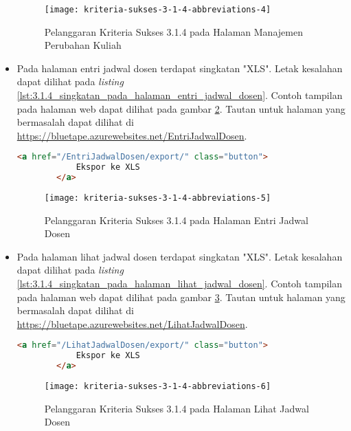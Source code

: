 \begin{itemize}
    \begin{figure}[H]
        \centering  
        \texttt{[image: kriteria-sukses-3-1-4-abbreviations-4]}  
        \caption[Pelanggaran Kriteria Sukses 3.1.4 pada Halaman Manajemen Perubahan Kuliah]{Pelanggaran Kriteria Sukses 3.1.4 pada Halaman Manajemen Perubahan Kuliah}
        \label{fig:3.1.4_abbreviations_4}  
    \end{figure}
    
    \item Pada halaman entri jadwal dosen terdapat singkatan "XLS". Letak kesalahan dapat dilihat pada \textit{listing} \ref{lst:3.1.4_singkatan_pada_halaman_entri_jadwal_dosen}. Contoh tampilan pada halaman web dapat dilihat pada gambar \ref{fig:3.1.4_abbreviations_5}. Tautan untuk halaman yang bermasalah dapat dilihat di \url{https://bluetape.azurewebsites.net/EntriJadwalDosen}.
    \begin{lstlisting}[frame=single, label={lst:3.1.4_singkatan_pada_halaman_entri_jadwal_dosen}, language=HTML, caption=Pelanggaran Kriteria Sukses 3.1.4 pada Halaman Entri Jadwal Dosen]
        <a href="/EntriJadwalDosen/export/" class="button">
            Ekspor ke XLS
        </a>
    \end{lstlisting}

    \begin{figure}[H]
        \centering  
        \texttt{[image: kriteria-sukses-3-1-4-abbreviations-5]}  
        \caption[Pelanggaran Kriteria Sukses 3.1.4 pada Halaman Entri Jadwal Dosen]{Pelanggaran Kriteria Sukses 3.1.4 pada Halaman Entri Jadwal Dosen}
        \label{fig:3.1.4_abbreviations_5}  
    \end{figure}
    
    \item Pada halaman lihat jadwal dosen terdapat singkatan "XLS". Letak kesalahan dapat dilihat pada \textit{listing} \ref{lst:3.1.4_singkatan_pada_halaman_lihat_jadwal_dosen}. Contoh tampilan pada halaman web dapat dilihat pada gambar \ref{fig:3.1.4_abbreviations_6}. Tautan untuk halaman yang bermasalah dapat dilihat di \url{https://bluetape.azurewebsites.net/LihatJadwalDosen}.
    \begin{lstlisting}[frame=single, label={lst:3.1.4_singkatan_pada_halaman_lihat_jadwal_dosen}, language=HTML, caption=Pelanggaran Kriteria Sukses 3.1.4 pada Halaman Lihat Jadwal Dosen]
        <a href="/LihatJadwalDosen/export/" class="button">
            Ekspor ke XLS
        </a>
    \end{lstlisting}

    \begin{figure}[H]
        \centering  
        \texttt{[image: kriteria-sukses-3-1-4-abbreviations-6]}  
        \caption[Pelanggaran Kriteria Sukses 3.1.4 pada Halaman Lihat Jadwal Dosen]{Pelanggaran Kriteria Sukses 3.1.4 pada Halaman Lihat Jadwal Dosen}
        \label{fig:3.1.4_abbreviations_6}  
    \end{figure}
\end{itemize}

